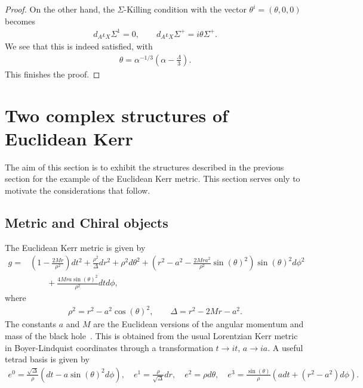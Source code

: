 \documentclass[10pt]{report}
\theoremstyle{definition}
\begin{document}
\begin{proof}
    On the other hand, the $\Sigma$-Killing condition with the vector $\theta^i=(\theta,0,0)$ becomes
    \begin{align}
    d_A \iota_X \Sigma^1 = 0, \qquad d_A \iota_X\Sigma^+= i \theta \Sigma^+.
     \end{align}
     We see that this is indeed satisfied, with
     \begin{align}
     \theta = \alpha^{-1/3}(\alpha - \frac{\Lambda}{3}).
     \end{align}
     This finishes the proof. 
   \end{proof}
   
\section{Two complex structures of Euclidean Kerr}\label{sec:Kerr}
   
The aim of this section is to exhibit the structures described in the previous section for the example of the Euclidean Kerr metric. This section serves only to motivate the considerations that follow. 

\subsection{Metric and Chiral objects}

The Euclidean Kerr metric is given by
\begin{equation}
\begin{aligned}\label{eq:EuclideanKerrMetric} 
    g = & \left( 1- \frac{2Mr}{\rho^2} \right) dt^2 + \frac{\rho^2}{\Delta} dr^2 + \rho^2 d\theta^2 + \left( r^2 -a^2 - \frac{2Mr a^2}{\rho^2} \sin(\theta)^2 \right) \sin(\theta)^2 d\phi^2 \\ & \qquad + \frac{4Mra\sin(\theta)^2}{\rho^2} dt d\phi,
\end{aligned}
\end{equation}
where 
\begin{align}\label{rho-delta}
\rho^2 = r^2 - a^2 \cos(\theta)^2, \qquad \Delta = r^2 - 2Mr - a^2.
\end{align}
The constants $a$ and $M$ are the Euclidean versions of the angular momentum and mass of the black hole~\cite{The_Kerr_spacet_Visser_2007}. This is obtained from the usual Lorentzian Kerr metric in Boyer-Lindquist coordinates through a transformation $t \rightarrow it$, $a \rightarrow ia$.
A useful tetrad basis is given by
\begin{align}
    e^0 = \frac{\sqrt{\Delta}}{\rho}(dt - a \sin(\theta)^2 d\phi), \quad e^1 = \frac{\rho}{\sqrt{\Delta}}dr,\quad e^2 = \rho d\theta,\quad e^3 = \frac{\sin(\theta)}{\rho}(a dt + (r^2 - a^2) d\phi).\label{eq:KerrTetradBasis}
\end{align}
\end{document}
